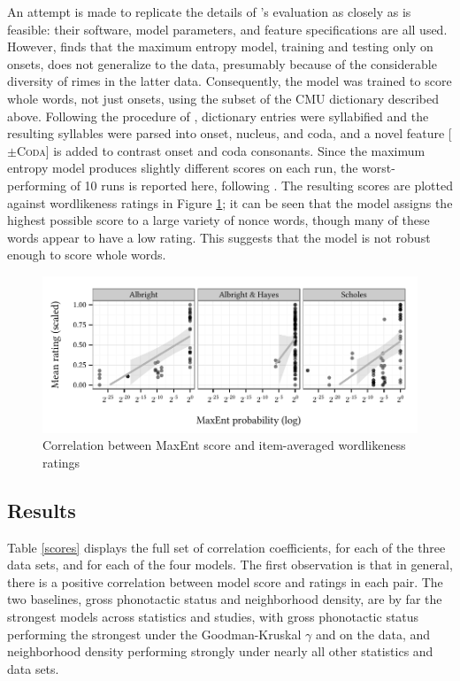 An attempt is made to replicate the details of \citeauthor{Hayes2008a}'s evaluation as closely as is feasible: their software, model parameters, and feature specifications are all used. However, \citet{Albright2009a} finds that the maximum entropy model, training and testing only on onsets, does not generalize to the \citet{Albright2003b} data, presumably because of the considerable diversity of rimes in the latter data. Consequently, the model was trained to score whole words, not just onsets, using the subset of the CMU dictionary described above. Following the procedure of \citet{HayesInPress}, dictionary entries were syllabified and the resulting syllables were parsed into onset, nucleus, and coda, and a novel feature [$\pm$\textsc{Coda}] is added to contrast onset and coda consonants. Since the maximum entropy model produces slightly different scores on each run, the worst-performing of 10 runs is reported here, following \citet{Hayes2008a}. The resulting scores are plotted against wordlikeness ratings in Figure \ref{maxent}; it can be seen that the model assigns the highest possible score to a large variety of nonce words, though many of these words appear to have a low rating. This suggests that the model is not robust enough to score whole words.

\begin{figure}
\centering
\includegraphics{maxent.pdf}
\caption{Correlation between MaxEnt score and item-averaged wordlikeness ratings}
\label{maxent}
\end{figure}

\subsection{Results}

Table \ref{scores} displays the full set of correlation coefficients, for each of the three data sets, and for each of the four models. The first observation is that in general, there is a positive correlation between model score and ratings in each pair. The two baselines, gross phonotactic status and neighborhood density, are by far the strongest models across statistics and studies, with gross phonotactic status performing the strongest under the Goodman-Kruskal $\gamma$ and on the \citet{Albright2007} data, and neighborhood density performing strongly under nearly all other statistics and data sets. 

